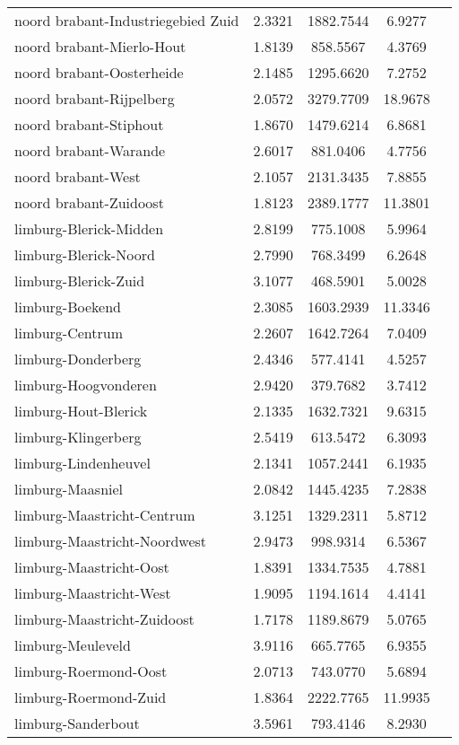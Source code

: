 \begin{longtable}{llccc}
noord brabant-Industriegebied Zuid & 2.3321 & 1882.7544 & 6.9277 \\
noord brabant-Mierlo-Hout & 1.8139 & 858.5567 & 4.3769 \\
noord brabant-Oosterheide & 2.1485 & 1295.6620 & 7.2752 \\
noord brabant-Rijpelberg & 2.0572 & 3279.7709 & 18.9678 \\
noord brabant-Stiphout & 1.8670 & 1479.6214 & 6.8681 \\
noord brabant-Warande & 2.6017 & 881.0406 & 4.7756 \\
noord brabant-West & 2.1057 & 2131.3435 & 7.8855 \\
noord brabant-Zuidoost & 1.8123 & 2389.1777 & 11.3801 \\
limburg-Blerick-Midden & 2.8199 & 775.1008 & 5.9964 \\
limburg-Blerick-Noord & 2.7990 & 768.3499 & 6.2648 \\
limburg-Blerick-Zuid & 3.1077 & 468.5901 & 5.0028 \\
limburg-Boekend & 2.3085 & 1603.2939 & 11.3346 \\
limburg-Centrum & 2.2607 & 1642.7264 & 7.0409 \\
limburg-Donderberg & 2.4346 & 577.4141 & 4.5257 \\
limburg-Hoogvonderen & 2.9420 & 379.7682 & 3.7412 \\
limburg-Hout-Blerick & 2.1335 & 1632.7321 & 9.6315 \\
limburg-Klingerberg & 2.5419 & 613.5472 & 6.3093 \\
limburg-Lindenheuvel & 2.1341 & 1057.2441 & 6.1935 \\
limburg-Maasniel & 2.0842 & 1445.4235 & 7.2838 \\
limburg-Maastricht-Centrum & 3.1251 & 1329.2311 & 5.8712 \\
limburg-Maastricht-Noordwest & 2.9473 & 998.9314 & 6.5367 \\
limburg-Maastricht-Oost & 1.8391 & 1334.7535 & 4.7881 \\
limburg-Maastricht-West & 1.9095 & 1194.1614 & 4.4141 \\
limburg-Maastricht-Zuidoost & 1.7178 & 1189.8679 & 5.0765 \\
limburg-Meuleveld & 3.9116 & 665.7765 & 6.9355 \\
limburg-Roermond-Oost & 2.0713 & 743.0770 & 5.6894 \\
limburg-Roermond-Zuid & 1.8364 & 2222.7765 & 11.9935 \\
limburg-Sanderbout & 3.5961 & 793.4146 & 8.2930 \\

\end{longtable}

